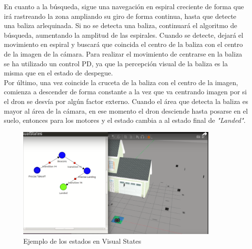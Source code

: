 \hspace{1cm} En cuanto a la búsqueda, sigue una navegación en espiral creciente de forma que irá rastreando la zona ampliando su giro de forma continua, hasta que detecte una baliza arlequinada. Si no se detecta una baliza, continuará el algoritmo de búsqueda, aumentando la amplitud de las espirales. Cuando se detecte, dejará el movimiento en espiral y buscará que coincida el centro de la baliza con el centro de la imagen de la cámara.  Para realizar el movimiento de centrarse en la baliza se ha utilizado un control PD, ya que la percepción visual de la baliza es la misma que en el estado de despegue.  
\\

\hspace{1cm} Por último, una vez coincide la cruceta de la baliza con el centro de la imagen, comienza a descender de forma constante a la vez que va centrando imagen por si el dron se desvía por algún factor externo. Cuando el área que detecta la baliza es mayor al área de la cámara, en ese momento el dron desciende hasta  posarse en el suelo, entonces para los motores y el estado cambia a al estado final de \textit{"Landed"}.

\begin{figure}[H]
	\begin{center}
		\includegraphics[width=0.9\textwidth]{imag/IMG34.png}
				\caption{Ejemplo de los estados en Visual States}
		\label{fig:Ejemplo Visual States.}	
	\end{center}
\end{figure}